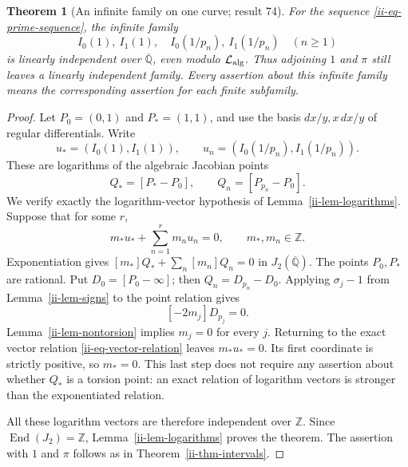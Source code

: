 \documentclass[11pt,a4paper]{article}
\newtheorem{theorem}{Theorem}[section]
\theoremstyle{definition}
\theoremstyle{remark}
\numberwithin{equation}{section}
\newcommand{\Qbar}{\overline{\mathbb Q}}
\begin{document}
\begin{theorem}[An infinite family on one curve; result 74]
\label{ii-thm-infinite}
For the sequence \eqref{ii-eq-prime-sequence}, the infinite family
\begin{equation}\label{ii-eq-infinite-family}
 I_0(1),\ I_1(1),\quad
 I_0(1/p_n),\ I_1(1/p_n)\quad(n\ge1)
\end{equation}
is linearly independent over $\Qbar$, even modulo
$\mathcal L_{\rm alg}$.  Thus adjoining $1$ and $\pi$ still leaves
a linearly independent family.  Every assertion about this infinite
family means the corresponding assertion for each finite subfamily.
\end{theorem}
\begin{proof}
Let $P_0=(0,1)$ and $P_*=(1,1)$, and use the basis
$dx/y,x\,dx/y$ of regular differentials.  Write
\[
 u_*=(I_0(1),I_1(1)),\qquad
 u_n=(I_0(1/p_n),I_1(1/p_n)).
\]
These are logarithms of the algebraic Jacobian points
\[
 Q_*=[P_*-P_0],\qquad Q_n=[P_{p_n}-P_0].
\]
We verify exactly the logarithm-vector hypothesis of
Lemma~\ref{ii-lem-logarithms}.  Suppose that for some $r$,
\begin{equation}\label{ii-eq-vector-relation}
 m_*u_*+\sum_{n=1}^r m_nu_n=0,
 \qquad m_*,m_n\in\mathbb Z.
\end{equation}
Exponentiation gives
$[m_*]Q_*+\sum_n[m_n]Q_n=0$ in $J_2(\Qbar)$.
The points $P_0,P_*$ are rational.  Put $D_0=[P_0-\infty]$; then
$Q_n=D_{p_n}-D_0$.  Applying $\sigma_j-1$ from
Lemma~\ref{ii-lem-signs} to the point relation gives
\[
 [-2m_j]D_{p_j}=0.
\]
Lemma~\ref{ii-lem-nontorsion} implies $m_j=0$ for every $j$.
Returning to the exact vector relation \eqref{ii-eq-vector-relation}
leaves $m_*u_*=0$.  Its first coordinate is strictly positive, so
$m_*=0$.  This last step does not require any assertion about whether
$Q_*$ is a torsion point: an exact relation of logarithm vectors is
stronger than the exponentiated relation.

All these logarithm vectors are therefore independent over $\mathbb Z$.
Since $\operatorname{End}(J_2)=\mathbb Z$,
Lemma~\ref{ii-lem-logarithms} proves the theorem.  The assertion with
$1$ and $\pi$ follows as in Theorem~\ref{ii-thm-intervals}.
\end{proof}
\end{document}
